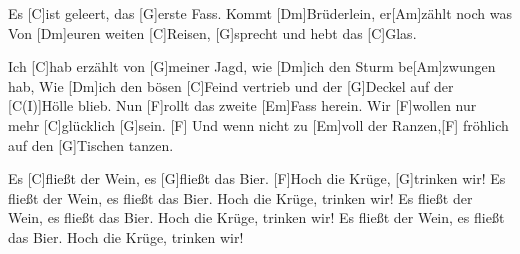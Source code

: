 \begin{guitar}
	\begin{highlightbar}
		Es [C]ist geleert, das [G]erste Fass. Kommt [Dm]Brüderlein, er[Am]zählt noch was
		Von [Dm]euren weiten [C]Reisen, [G]sprecht und hebt das [C]Glas.
	\end{highlightbar}
	
	Ich [C]hab erzählt von [G]meiner Jagd, wie [Dm]ich den Sturm be[Am]zwungen hab,
	Wie [Dm]ich den bösen [C]Feind vertrieb und der [G]Deckel auf der [C(I)]Hölle blieb.
	Nun [F]rollt das zweite [Em]Fass herein. Wir [F]wollen nur mehr [C]glücklich [G]sein.
	[F] Und wenn nicht zu [Em]voll der Ranzen,[F] fröhlich auf den [G]Tischen tanzen.
	
	Es [C]fließt der Wein, es [G]fließt das Bier. [F]Hoch die Krüge, [G]trinken wir!
	Es fließt der Wein, es fließt das Bier. Hoch die Krüge, trinken wir!
	Es fließt der Wein, es fließt das Bier. Hoch die Krüge, trinken wir!
	Es fließt der Wein, es fließt das Bier. Hoch die Krüge, trinken wir!
\end{guitar}





